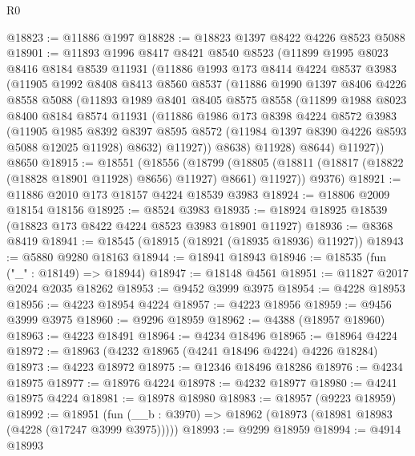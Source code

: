 \begin{lexlean}{R0}
\begin{coremodule}
@18823 := @11886 @1997
@18828 := @18823 @1397 @8422 @4226 @8523 @5088
@18901 := @11893
    @1996
    @8417
    @8421
    @8540
    @8523
    (@11899
      @1995
      @8023
      @8416
      @8184
      @8539
      @11931
      (@11886
        @1993
        @173
        @8414
        @4224
        @8537
        @3983
        (@11905
          @1992
          @8408
          @8413
          @8560
          @8537
          (@11886
            @1990
            @1397
            @8406
            @4226
            @8558
            @5088
            (@11893
              @1989
              @8401
              @8405
              @8575
              @8558
              (@11899
                @1988
                @8023
                @8400
                @8184
                @8574
                @11931
                (@11886
                  @1986
                  @173
                  @8398
                  @4224
                  @8572
                  @3983
                  (@11905
                    @1985
                    @8392
                    @8397
                    @8595
                    @8572
                    (@11984 @1397 @8390 @4226 @8593 @5088 @12025 @11928)
                    @8632)
                  @11927))
              @8638)
            @11928)
          @8644)
        @11927))
    @8650
@18915 := @18551
    (@18556
      (@18799 (@18805 (@18811 (@18817 (@18822 (@18828 @18901 @11928) @8656) @11927) @8661) @11927))
      @9376)
@18921 := @11886 @2010 @173 @18157 @4224 @18539 @3983
@18924 := @18806 @2009 @18154 @18156
@18925 := @8524 @3983
@18935 := @18924 @18925 @18539 (@18823 @173 @8422 @4224 @8523 @3983 @18901 @11927)
@18936 := @8368 @8419
@18941 := @18545 (@18915 (@18921 (@18935 @18936) @11927))
@18943 := @5880 @9280 @18163
@18944 := @18941 @18943
@18946 := @18535 (fun ("_" : @18149) => @18944)
@18947 := @18148 @4561
@18951 := @11827 @2017 @2024 @2035 @18262
@18953 := @9452 @3999 @3975
@18954 := @4228 @18953
@18956 := @4223 @18954 @4224
@18957 := @4223 @18956
@18959 := @9456 @3999 @3975
@18960 := @9296 @18959
@18962 := @4388 (@18957 @18960)
@18963 := @4223 @18491
@18964 := @4234 @18496
@18965 := @18964 @4224
@18972 := @18963 (@4232 @18965 (@4241 @18496 @4224) @4226 @18284)
@18973 := @4223 @18972
@18975 := @12346 @18496 @18286
@18976 := @4234 @18975
@18977 := @18976 @4224
@18978 := @4232 @18977
@18980 := @4241 @18975 @4224
@18981 := @18978 @18980
@18983 := @18957 (@9223 @18959)
@18992 := @18951 (fun (__b : @3970) => @18962 (@18973 (@18981 @18983 (@4228 (@17247 @3999 @3975)))))
@18993 := @9299 @18959
@18994 := @4914 @18993

\end{coremodule}
\end{lexlean}
